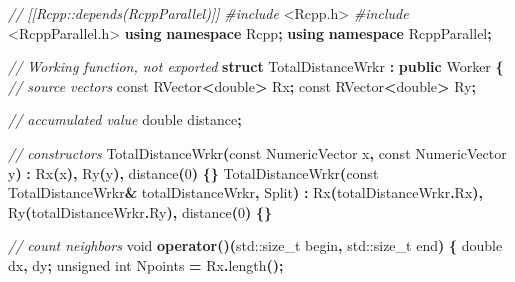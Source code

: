\documentclass[
  12pt,
  american,
  a4paper,
  extrafontsizes,onecolumn,openright
  ]{memoir}
\newenvironment{Shaded}{\begin{snugshade}}{\end{snugshade}}
\newcommand{\AttributeTok}[1]{\textcolor[rgb]{0.13,0.29,0.53}{#1}}
\newcommand{\BuiltInTok}[1]{#1}
\newcommand{\CommentTok}[1]{\textcolor[rgb]{0.56,0.35,0.01}{\textit{#1}}}
\newcommand{\DataTypeTok}[1]{\textcolor[rgb]{0.13,0.29,0.53}{#1}}
\newcommand{\DecValTok}[1]{\textcolor[rgb]{0.00,0.00,0.81}{#1}}
\newcommand{\ImportTok}[1]{#1}
\newcommand{\KeywordTok}[1]{\textcolor[rgb]{0.13,0.29,0.53}{\textbf{#1}}}
\newcommand{\NormalTok}[1]{#1}
\newcommand{\OperatorTok}[1]{\textcolor[rgb]{0.81,0.36,0.00}{\textbf{#1}}}
\newcommand{\PreprocessorTok}[1]{\textcolor[rgb]{0.56,0.35,0.01}{\textit{#1}}}
\begin{document}
\scriptsize

\begin{Shaded}
\begin{Highlighting}[]
\CommentTok{// [[Rcpp::depends(RcppParallel)]]}
\PreprocessorTok{\#include }\ImportTok{\textless{}Rcpp.h\textgreater{}}
\PreprocessorTok{\#include }\ImportTok{\textless{}RcppParallel.h\textgreater{}}
\KeywordTok{using} \KeywordTok{namespace}\NormalTok{ Rcpp}\OperatorTok{;}
\KeywordTok{using} \KeywordTok{namespace}\NormalTok{ RcppParallel}\OperatorTok{;}

\CommentTok{// Working function, not exported}
\KeywordTok{struct}\NormalTok{ TotalDistanceWrkr }\OperatorTok{:} \KeywordTok{public}\NormalTok{ Worker}
\OperatorTok{\{}
  \CommentTok{// source vectors}
  \AttributeTok{const}\NormalTok{ RVector}\OperatorTok{\textless{}}\DataTypeTok{double}\OperatorTok{\textgreater{}}\NormalTok{ Rx}\OperatorTok{;}
  \AttributeTok{const}\NormalTok{ RVector}\OperatorTok{\textless{}}\DataTypeTok{double}\OperatorTok{\textgreater{}}\NormalTok{ Ry}\OperatorTok{;}
  
  \CommentTok{// accumulated value}
  \DataTypeTok{double}\NormalTok{ distance}\OperatorTok{;}
   
  \CommentTok{// constructors}
\NormalTok{  TotalDistanceWrkr}\OperatorTok{(}\AttributeTok{const}\NormalTok{ NumericVector x}\OperatorTok{,} \AttributeTok{const}\NormalTok{ NumericVector y}\OperatorTok{)} \OperatorTok{:}
\NormalTok{    Rx}\OperatorTok{(}\NormalTok{x}\OperatorTok{),}\NormalTok{ Ry}\OperatorTok{(}\NormalTok{y}\OperatorTok{),}\NormalTok{ distance}\OperatorTok{(}\DecValTok{0}\OperatorTok{)} \OperatorTok{\{\}}
\NormalTok{  TotalDistanceWrkr}\OperatorTok{(}\AttributeTok{const}\NormalTok{ TotalDistanceWrkr}\OperatorTok{\&}\NormalTok{ totalDistanceWrkr}\OperatorTok{,}\NormalTok{ Split}\OperatorTok{)} \OperatorTok{:}
\NormalTok{    Rx}\OperatorTok{(}\NormalTok{totalDistanceWrkr}\OperatorTok{.}\NormalTok{Rx}\OperatorTok{),}\NormalTok{ Ry}\OperatorTok{(}\NormalTok{totalDistanceWrkr}\OperatorTok{.}\NormalTok{Ry}\OperatorTok{),}\NormalTok{  distance}\OperatorTok{(}\DecValTok{0}\OperatorTok{)} \OperatorTok{\{\}}
  
  \CommentTok{// count neighbors}
  \DataTypeTok{void} \KeywordTok{operator}\OperatorTok{()(}\BuiltInTok{std::}\NormalTok{size\_t begin}\OperatorTok{,} \BuiltInTok{std::}\NormalTok{size\_t end}\OperatorTok{)} \OperatorTok{\{}
    \DataTypeTok{double}\NormalTok{ dx}\OperatorTok{,}\NormalTok{ dy}\OperatorTok{;}
    \DataTypeTok{unsigned} \DataTypeTok{int}\NormalTok{ Npoints }\OperatorTok{=}\NormalTok{ Rx}\OperatorTok{.}\NormalTok{length}\OperatorTok{();}


\end{Highlighting}
\end{Shaded}
\end{document}

